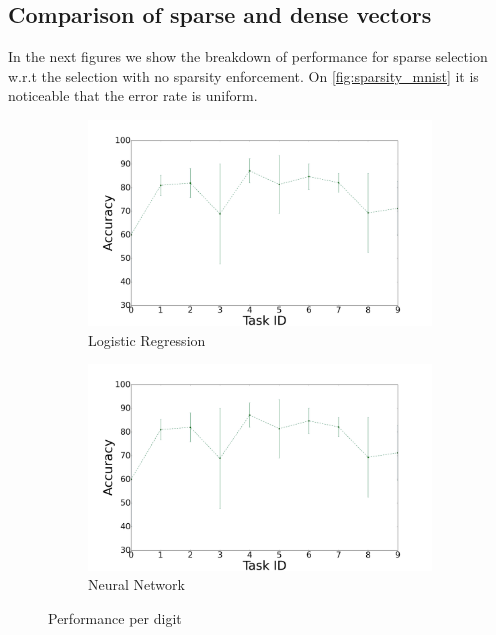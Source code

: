 \documentclass{llncs}
\begin{document}
\subsection{Comparison of sparse and dense vectors}

In the next figures we show the breakdown of performance for sparse selection w.r.t the selection with no sparsity enforcement. On \autoref{fig:sparsity_mnist} it is noticeable that the error rate is uniform.

\begin{figure}[!htb]
    \centering
    \begin{subfigure}[b]{0.45\textwidth}
        \includegraphics[width=\textwidth]{figures/plot_mlp}
        \caption{Logistic Regression}
    \end{subfigure}
    \begin{subfigure}[b]{0.45\textwidth}
        \includegraphics[width=\textwidth]{figures/plot_mlp}
        \caption{Neural Network}
    \end{subfigure}
  \caption{Performance per digit}
  \label{fig:sparsity_mnist}
\end{figure}
\end{document}
